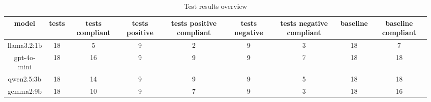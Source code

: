 
  \begin{table}[h!]
  \centering
  \begin{tabular}{|c|c|c|c|c|c|c|c|c|}
  \hline
  model & tests & tests compliant & tests positive & tests positive compliant & tests negative & tests negative compliant & baseline & baseline compliant \\
  \hline
  llama3.2:1b & 18 & 5 & 9 & 2 & 9 & 3 & 18 & 7\\
\hline
gpt-4o-mini & 18 & 16 & 9 & 9 & 9 & 7 & 18 & 18\\
\hline
qwen2.5:3b & 18 & 14 & 9 & 9 & 9 & 5 & 18 & 18\\
\hline
gemma2:9b & 18 & 10 & 9 & 7 & 9 & 3 & 18 & 16
  \end{tabular}
  \caption{Test results overview}
  
  \end{table}
  